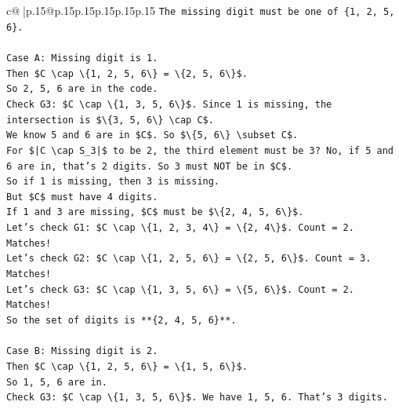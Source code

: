 \documentclass{article}
\begin{document}
{\begin{supertabular}{c@{$\;$}|p{.15\linewidth}@{}p{.15\linewidth}p{.15\linewidth}p{.15\linewidth}p{.15\linewidth}p{.15\linewidth}}
{{{\texttt{The missing digit must be one of \{1, 2, 5, 6\}.} \\
\\ 
\texttt{Case A: Missing digit is 1.} \\
\texttt{Then \$C \textbackslash{}cap \textbackslash{}\{1, 2, 5, 6\textbackslash{}\} = \textbackslash{}\{2, 5, 6\textbackslash{}\}\$.} \\
\texttt{So 2, 5, 6 are in the code.} \\
\texttt{Check G3: \$C \textbackslash{}cap \textbackslash{}\{1, 3, 5, 6\textbackslash{}\}\$. Since 1 is missing, the intersection is \$\textbackslash{}\{3, 5, 6\textbackslash{}\} \textbackslash{}cap C\$.} \\
\texttt{We know 5 and 6 are in \$C\$. So \$\textbackslash{}\{5, 6\textbackslash{}\} \textbackslash{}subset C\$.} \\
\texttt{For \$|C \textbackslash{}cap S\_3|\$ to be 2, the third element must be 3? No, if 5 and 6 are in, that's 2 digits. So 3 must NOT be in \$C\$.} \\
\texttt{So if 1 is missing, then 3 is missing.} \\
\texttt{But \$C\$ must have 4 digits.} \\
\texttt{If 1 and 3 are missing, \$C\$ must be \$\textbackslash{}\{2, 4, 5, 6\textbackslash{}\}\$.} \\
\texttt{Let's check G1: \$C \textbackslash{}cap \textbackslash{}\{1, 2, 3, 4\textbackslash{}\} = \textbackslash{}\{2, 4\textbackslash{}\}\$. Count = 2. Matches!} \\
\texttt{Let's check G2: \$C \textbackslash{}cap \textbackslash{}\{1, 2, 5, 6\textbackslash{}\} = \textbackslash{}\{2, 5, 6\textbackslash{}\}\$. Count = 3. Matches!} \\
\texttt{Let's check G3: \$C \textbackslash{}cap \textbackslash{}\{1, 3, 5, 6\textbackslash{}\} = \textbackslash{}\{5, 6\textbackslash{}\}\$. Count = 2. Matches!} \\
\texttt{So the set of digits is **\{2, 4, 5, 6\}**.} \\
\\ 
\texttt{Case B: Missing digit is 2.} \\
\texttt{Then \$C \textbackslash{}cap \textbackslash{}\{1, 2, 5, 6\textbackslash{}\} = \textbackslash{}\{1, 5, 6\textbackslash{}\}\$.} \\
\texttt{So 1, 5, 6 are in.} \\
\texttt{Check G3: \$C \textbackslash{}cap \textbackslash{}\{1, 3, 5, 6\textbackslash{}\}\$. We have 1, 5, 6. That's 3 digits.} \\
}}}
\end{supertabular}}
\end{document}
